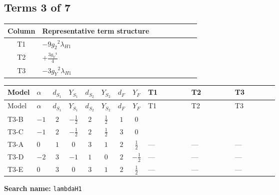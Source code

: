 \documentclass[8pt]{article}
\begin{document}
\begin{landscape}
\subsection*{Terms 3 of 7}
\begin{center}
\begin{tabular}{@{}c >{\raggedright\arraybackslash}p{0.82\linewidth}@{}}
\toprule
Column & Representative term structure \\
\midrule
T1 & \(\displaystyle -9 {g_2}^2 {\lambda_{H1}}\) \\
\midrule
T2 & \(\displaystyle +\frac{3 {g_Y}^4}{4}\) \\
\midrule
T3 & \(\displaystyle -3 {g_Y}^2 {\lambda_{H1}}\) \\
\midrule
\bottomrule
\end{tabular}
\end{center}
\smallskip
\tiny
\begin{longtable}{@{}llcccccc >{\raggedright\arraybackslash}p{0.21\linewidth} >{\raggedright\arraybackslash}p{0.21\linewidth} >{\raggedright\arraybackslash}p{0.21\linewidth}@{}}
\toprule
Model & $\alpha$ & $d_{S_1}$ & $Y_{S_1}$ & $d_{S_2}$ & $Y_{S_2}$ & $d_F$ & $Y_F$ & T1 & T2 & T3 \\
\midrule
\endfirsthead
\toprule
Model & $\alpha$ & $d_{S_1}$ & $Y_{S_1}$ & $d_{S_2}$ & $Y_{S_2}$ & $d_F$ & $Y_F$ & T1 & T2 & T3 \\
\midrule
\endhead
T3-B & $-1$ & $2$ & $-\frac{1}{2}$ & $2$ & $\frac{1}{2}$ & $1$ & $0$ & \scriptsize\adjustbox{max width=\linewidth}{$\begin{gathered} -9 {g_2}^2 {\lambda_{H1}}\end{gathered}$} & \scriptsize\adjustbox{max width=\linewidth}{$\begin{gathered} +\frac{3 {g_Y}^4}{4}\end{gathered}$} & \scriptsize\adjustbox{max width=\linewidth}{$\begin{gathered} -3 {g_Y}^2 {\lambda_{H1}}\end{gathered}$} \\
\midrule
T3-C & $-1$ & $2$ & $-\frac{1}{2}$ & $2$ & $\frac{1}{2}$ & $3$ & $0$ & \scriptsize\adjustbox{max width=\linewidth}{$\begin{gathered} -9 {g_2}^2 {\lambda_{H1}}\end{gathered}$} & \scriptsize\adjustbox{max width=\linewidth}{$\begin{gathered} +\frac{3 {g_Y}^4}{4}\end{gathered}$} & \scriptsize\adjustbox{max width=\linewidth}{$\begin{gathered} -3 {g_Y}^2 {\lambda_{H1}}\end{gathered}$} \\
\midrule
T3-A & $0$ & $1$ & $0$ & $3$ & $1$ & $2$ & $\frac{1}{2}$ & --- & --- & --- \\
\midrule
T3-D & $-2$ & $3$ & $-1$ & $1$ & $0$ & $2$ & $-\frac{1}{2}$ & --- & --- & --- \\
\midrule
T3-E & $0$ & $3$ & $0$ & $3$ & $1$ & $2$ & $\frac{1}{2}$ & --- & --- & --- \\
\midrule
\bottomrule
\end{longtable}
\clearpage
\noindent\textbf{Search name: }\texttt{lambdaH1}\par\smallskip

\end{landscape}
\end{document}

